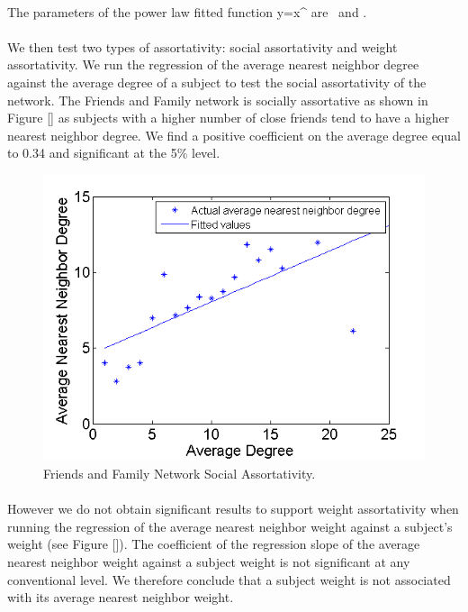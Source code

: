 \documentclass[11pt]{article}
\begin{document}
\paragraph{}
The parameters of the power law fitted function y=\alpha x^\beta \]   are  \] \ and \].

\paragraph{}
We then test two types of assortativity: social assortativity and weight assortativity. We run the regression of the average nearest neighbor degree against the average degree of a subject to test the social assortativity of the network. The Friends and Family network is socially assortative as shown in Figure [] as subjects with a higher number of close friends tend to have a higher nearest neighbor degree. We find a positive coefficient on the average degree equal to 0.34 and significant at the 5\% level.


\begin{figure}[!ht]
\center
   \includegraphics[scale=0.72]{social_assortativity_figure2.png}
   \caption{\label{2} Friends and Family Network Social Assortativity.}
\end{figure}

\paragraph{}
However we do not obtain significant results to support weight assortativity when running the regression of the average nearest neighbor weight against a subject's weight (see Figure []). The coefficient of the regression slope of the average nearest neighbor weight against a subject weight is not significant at any conventional level. We therefore conclude that a subject weight is not associated with its average nearest neighbor weight. 
\end{document}
